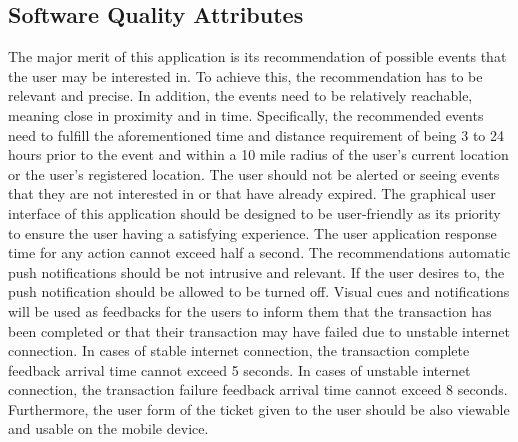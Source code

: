 \documentclass{article}
\begin{document}
		 \subsection{Software Quality Attributes}
		    The major merit of this application is its recommendation of possible events that the user may be interested in. To achieve this, the recommendation has to be relevant and precise. In addition, the events need to be relatively reachable, meaning close in proximity and in time. Specifically, the recommended events need to fulfill the aforementioned time and distance requirement of being 3 to 24 hours prior to the event and within a 10 mile radius of the user’s current location or the user’s registered location. The user should not be alerted or seeing events that they are not interested in or that have already expired. The graphical user interface of this application should be designed to be user-friendly as its priority to ensure the user having a satisfying experience. The user application response time for any action cannot exceed half a second. The recommendations automatic push notifications should be not intrusive and relevant. If the user desires to, the push notification should be allowed to be turned off. Visual cues and notifications will be used as feedbacks for the users to inform them that the transaction has been completed or that their transaction may have failed due to unstable internet connection. In cases of stable internet connection, the transaction complete feedback arrival time cannot exceed 5 seconds. In cases of unstable internet connection, the transaction failure feedback arrival time cannot exceed 8 seconds. Furthermore, the user form of the ticket given to the user should be also viewable and usable on the mobile device.
		 
\end{document}
